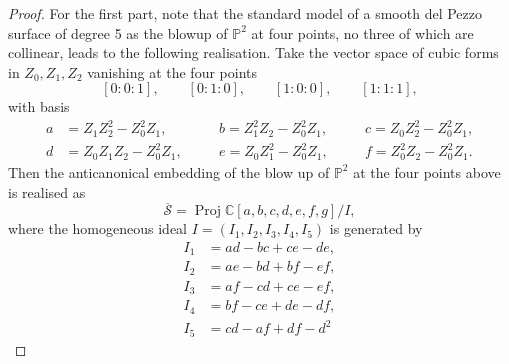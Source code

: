 \documentclass[a4paper,reqno]{amsart}
\numberwithin{equation}{section}
\newcommand{\C}{\mathbb{C}}
\newcommand{\p}{\mathbb{P}}
\DeclareMathOperator{\Proj}{Proj}
\numberwithin{equation}{section}
\begin{document}
\begin{proof}
    For the first part, note that the standard model of a smooth del Pezzo surface of degree 5 as the blowup of $\p^2$ at four points, no three of which are collinear, leads to the following realisation.
    Take the vector space of cubic forms in $Z_0,Z_1,Z_2$ vanishing at the four points 
    $$[0:0:1], \qquad [0:1:0], \qquad [1:0:0], \qquad [1:1:1],$$
    with basis 
    \begin{equation*}
        \begin{aligned}
        a&= Z_1Z_2^2- Z_0^2 Z_1, &\quad& 
        b=Z_1^2 Z_2-Z_0^2 Z_1, &\quad& 
        c=Z_0 Z_2^2-Z_0^2 Z_1, \\
        d&=Z_0 Z_1 Z_2-Z_0^2 Z_1, &\quad& 
        e=Z_0 Z_1^2-Z_0^2 Z_1, &\quad& 
        f=Z_0^2 Z_2-Z_0^2 Z_1.
        \end{aligned}
    \end{equation*}
    Then the anticanonical embedding of the blow up of $\p^2$ at the four points above is realised as 
    \begin{equation} \label{eq:standarddelPezzodeg5PI}
        \overline{\mathcal{S}} = \Proj \C[a,b,c,d,e,f,g] / I,
    \end{equation}
    where the homogeneous ideal $I = (I_1,I_2,I_3,I_4,I_5)$ is generated by 
\begin{align*}
        I_1 &= a d-b c+c e-d e,\\
        I_2 &= a e-b d+b f-e f,\\
        I_3 &= a f-c d+c e-e f,\\
        I_4 &= b f-c e+d e-d f,\\
        I_5 &= c d-a f+d f-d^2
    \end{align*}

\end{proof}
\end{document}
